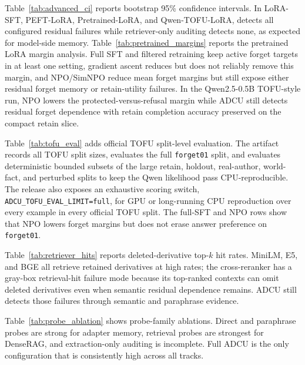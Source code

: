 

Table~\ref{tab:advanced_ci} reports bootstrap 95\% confidence intervals. In LoRA-SFT, PEFT-LoRA, Pretrained-LoRA, and Qwen-TOFU-LoRA, \method{} detects all configured residual failures while retriever-only auditing detects none, as expected for model-side memory. Table~\ref{tab:pretrained_margins} reports the pretrained LoRA margin analysis. Full SFT and filtered retraining keep active forget targets in at least one setting, gradient ascent reduces but does not reliably remove this margin, and NPO/SimNPO reduce mean forget margins but still expose either residual forget memory or retain-utility failures. In the Qwen2.5-0.5B TOFU-style run, NPO lowers the protected-versus-refusal margin while ADCU still detects residual forget dependence with retain completion accuracy preserved on the compact retain slice.



Table~\ref{tab:tofu_eval} adds official TOFU split-level evaluation. The artifact records all TOFU split sizes, evaluates the full \texttt{forget01} split, and evaluates deterministic bounded subsets of the large retain, holdout, real-author, world-fact, and perturbed splits to keep the Qwen likelihood pass CPU-reproducible. The release also exposes an exhaustive scoring switch, \texttt{ADCU\_TOFU\_EVAL\_LIMIT=full}, for GPU or long-running CPU reproduction over every example in every official TOFU split. The full-SFT and NPO rows show that NPO lowers forget margins but does not erase answer preference on \texttt{forget01}.



Table~\ref{tab:retriever_hits} reports deleted-derivative top-$k$ hit rates. MiniLM, E5, and BGE all retrieve retained derivatives at high rates; the cross-reranker has a gray-box retrieval-hit failure mode because its top-ranked contexts can omit deleted derivatives even when semantic residual dependence remains. ADCU still detects those failures through semantic and paraphrase evidence.



Table~\ref{tab:probe_ablation} shows probe-family ablations. Direct and paraphrase probes are strong for adapter memory, retrieval probes are strongest for DenseRAG, and extraction-only auditing is incomplete. Full ADCU is the only configuration that is consistently high across all tracks.

